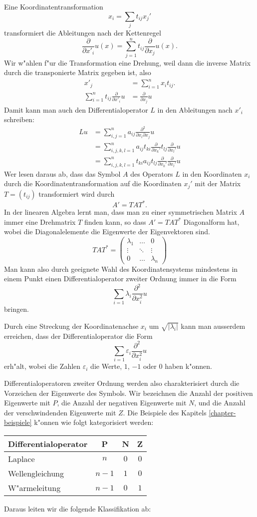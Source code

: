 Eine Koordinatentransformation
\[
x_i=\sum_{j}t_{ij}x_j'
\]
transformiert die Ableitungen nach der Kettenregel
\[
\frac{\partial}{\partial x'_i}u(x)=\sum_{j=1}^nt_{ij}\frac{\partial}{\partial x_j}u(x).
\]
Wir w"ahlen f"ur die Transformation eine Drehung, weil dann die
inverse Matrix durch die transponierte Matrix gegeben ist, also
\begin{align*}
x'_j&=\sum_{i=1}^nx_it_{ij}.
\\
\sum_{i=1}^nt_{ij}\frac{\partial}{\partial x'_i}u&=\frac{\partial}{\partial x_j}u
\end{align*}
Damit kann man auch den Differentialoperator $L$ in den Ableitungen nach $x'_i$
schreiben:
\begin{align*}
Lu&=\sum_{i,j=1}^na_{ij}\frac{\partial^2}{\partial x_i\partial x_j}u
\\
&=\sum_{i,j,k,l=1}^n a_{ij}
t_{ki}\frac{\partial}{\partial x_k'}
t_{lj}\frac{\partial}{\partial x_l'}u
\\
&=\sum_{i,j,k,l=1}^n
t_{ki}a_{ij}t_{lj}\frac{\partial}{\partial x_k'}
\frac{\partial}{\partial x_l'}u
\end{align*}
Wer lesen daraus ab, dass das Symbol $A$ des Operators $L$ in den Koordinaten
$x_i$ durch die Koordinatentransformation auf die Koordinaten $x_j'$ 
mit der Matrix $T=(t_{ij})$ transformiert wird durch
\[
A'=TAT^*.
\]
In der linearen Algebra lernt man, dass man zu einer symmetrischen
Matrix $A$ immer eine Drehmatrix $T$ finden kann, so dass
$A'=TAT^*$ Diagonalform hat, wobei die Diagonalelemente die
Eigenwerte der Eigenvektoren sind.
\[
TAT^*
=
\begin{pmatrix}\lambda_1&\dots&0\\
\vdots&\ddots&\vdots\\
0&\dots&\lambda_n
\end{pmatrix}
\]
Man kann also durch geeignete Wahl des Koordinatensystems mindestens in
einem Punkt einen Differentialoperator zweiter Ordnung immer in die
Form
\[
\sum_{i=1}\lambda_i\frac{\partial^2}{\partial x_i^2}u
\]
bringen.

Durch eine Streckung der Koordinatenachse $x_i$ um $\sqrt{|\lambda_i|}$
kann man ausserdem erreichen, dass der Differentialoperator die
Form
\[
\sum_{i=1}\varepsilon_i\frac{\partial^2}{\partial x_i^2}u
\]
erh"alt, wobei die Zahlen $\varepsilon_i$ die Werte, $1$, $-1$ oder $0$
haben k"onnen.

Differentialoperatoren zweiter Ordnung werden also charakterisiert durch
die Vorzeichen der Eigenwerte des Symbols. Wir bezeichnen die Anzahl
der positiven Eigenwerte mit $P$, die Anzahl der negativen Eigenwerte
mit $N$, und die Anzahl der verschwindenden Eigenwerte mit $Z$.
Die Beispiele des Kapitels \ref{chapter-beispiele} k"onnen wie
folgt kategorisiert werden:
\begin{center}
\begin{tabular}{l|ccc}
Differentialoperator&P&N&Z
\\
\hline
Laplace&
$n$&$0$&$0$
\\
Wellengleichung&
$n-1$&$1$&$0$
\\
W"armeleitung&
$n-1$&$0$&$1$
\end{tabular}
\end{center}
Daraus leiten wir die folgende Klassifikation ab:

